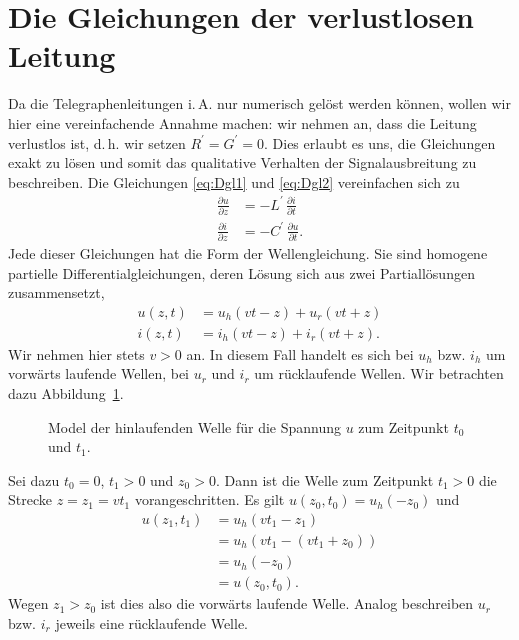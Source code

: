 \documentclass[paper=a4, parskip=half-, ngerman, fontsize=11pt]{scrreprt}
\begin{document}
\section{Die Gleichungen der verlustlosen Leitung}
\label{VerlustlosesModel}
Da die Telegraphenleitungen i.\,A. nur numerisch gelöst werden können, wollen wir hier eine vereinfachende Annahme
machen: wir nehmen an, dass die Leitung verlustlos ist, d.\,h. wir setzen \mbox{$R^{\prime} = G^{\prime} = 0$}. Dies
erlaubt es uns, die Gleichungen exakt zu lösen und somit das qualitative Verhalten der Signalausbreitung zu
beschreiben. Die Gleichungen \eqref{eq:Dgl1} und \eqref{eq:Dgl2} vereinfachen sich zu
\begin{align}
    \frac{\partial u}{\partial z} &= - L^{\prime} \, \frac{\partial i}{\partial t} \label{eq:Dgl7} \\[1ex]
    \frac{\partial i}{\partial z} &= - C^{\prime} \, \frac{\partial u}{\partial t} \label{eq:Dgl8} .
\end{align}
Jede dieser Gleichungen hat die Form der Wellengleichung. Sie sind homogene partielle Differentialgleichungen, deren
Lösung sich aus zwei Partiallösungen zusammensetzt,
\begin{align}
u(z, t) &= u_{h}(v t - z) + u_{r}(v t + z) \label{eq:AllgEq1} \\[1ex]
i(z, t) &= i_{h}(v t - z) + i_{r}(v t + z) \label{eq:AllgEq2}.
\end{align}
Wir nehmen hier stets $v > 0$ an. In diesem Fall handelt es sich bei $u_{h}$ bzw. $i_{h}$ um vorwärts laufende Wellen,
bei $u_{r}$ und $i_{r}$ um rücklaufende Wellen. Wir betrachten dazu Abbildung~\ref{VorwaertsWelle}.
\begin{figure}[!htb]
    \begin{center}
        
        \caption{Model der hinlaufenden Welle für die Spannung $u$ zum Zeitpunkt $t_{0}$ und $t_{1}$.}
        \label{VorwaertsWelle}
    \end{center}
\end{figure}
Sei dazu $t_{0} = 0$, $t_{1} > 0$ und $z_{0} > 0$. Dann ist die Welle zum Zeitpunkt $t_{1} > 0$ die Strecke
$z = z_{1} = v t_{1}$ vorangeschritten. Es gilt $u(z_{0}, t_{0}) = u_{h}(-z_{0})$ und
\begin{align*}
    u(z_{1}, t_{1}) &= u_{h}(v t_{1} - z_{1}) \\
                    &= u_{h}(v t_{1} - (v t_{1} + z_{0})) \\
                    &= u_{h}(- z_{0}) \\
                    &= u(z_{0}, t_{0}).
\end{align*}
Wegen $z_{1} > z_{0}$ ist dies also die vorwärts laufende Welle. Analog beschreiben $u_{r}$ bzw. $i_{r}$ jeweils eine
rücklaufende Welle.
\end{document}
